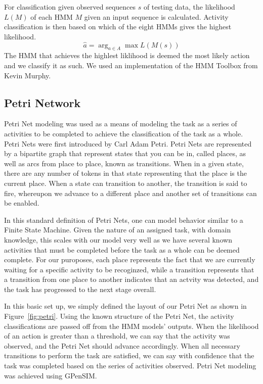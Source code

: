 \documentclass[10pt,twocolumn,letterpaper]{article}
\begin{document}
For classification given observed sequences $s$ of testing data, the likelihood $L(M)$ of each HMM $M$ given an input sequence is calculated. Activity classification is then based on which of the eight HMMs gives the highest likelihood. 
\begin{equation}
\hat a = \arg_{a\in A}\max L(M(s))
\end{equation}
The HMM that achieves the highlest liklihood is deemed the most likely action and we classify it as such. We used an implementation of the HMM Toolbox from Kevin Murphy\cite{murphyHMM}.

\subsection{Petri Network}
Petri Net modeling was used as a means of modeling the task as a series of activities to be completed to achieve the classification of the task as a whole. Petri Nets were first introduced by Carl Adam Petri\cite{petri1962kommunikation}. Petri Nets are represented by a bipartite graph that represent states that you can be in, called places, as well as arcs  from place to place, known as transitions. When in a given state, there are any number of tokens in that state representing that the place is the current place. When a state can transition to another, the transition is said to fire, whereupon we advance to a different place and another set of transitions can be enabled. 

In this standard definition of Petri Nets, one can model behavior similar to a Finite State Machine. Given the nature of an assigned task, with domain knowledge, this scales with our model very well as we have several known activities that must be completed before the task as a whole can be deemed complete. For our puroposes, each place represents the fact that we are currently waiting for a specific activity to be recoginzed, while a transition represents that a transition from one place to another indicates that an actvity was detected, and the task has progressed to the next stage overall.

In this basic set up, we simply defined the layout of our Petri Net as shown in Figure~\ref{fig:petri}. Using the known structure of the Petri Net, the activity classifications are passed off from the HMM models' outputs. When the likelihood of an action is greater than a threshold, we can say that the activity was observed, and the Petri Net should advance accordingly. When all necessary transitions to perform the task are satisfied, we can say with confidence that the task was completed based on the series of activities observed. Petri Net modeling was achieved using GPenSIM\cite{davidrajuh2010gpensim}.
\end{document}
